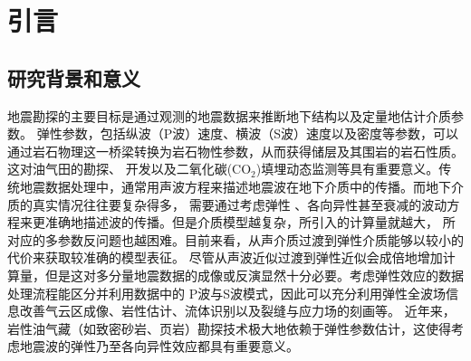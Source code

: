\chapter{引言}
\section{研究背景和意义}
地震勘探的主要目标是通过观测的地震数据来推断地下结构以及定量地估计介质参数。
弹性参数，包括纵波（P波）速度、横波（S波）速度以及密度等参数，可以通过岩石物理这一桥梁转换为岩石物性参数，从而获得储层及其围岩的岩石性质。这对油气田的勘探、
开发以及二氧化碳(CO$_2$)填埋动态监测等具有重要意义。传统地震数据处理中，通常用声波方程来描述地震波在地下介质中的传播。而地下介质的真实情况往往要复杂得多，
需要通过考虑弹性
、各向异性甚至衰减的波动方程来更准确地描述波的传播。但是介质模型越复杂，所引入的计算量就越大，
所对应的多参数反问题也越困难。目前来看，从声介质过渡到弹性介质能够以较小的代价来获取较准确的模型表征。
尽管从声波近似过渡到弹性近似会成倍地增加计算量，但是这对多分量地震数据的成像或反演显然十分必要。考虑弹性效应的数据处理流程能区分并利用数据中的
P波与S波模式，因此可以充分利用弹性全波场信息改善气云区成像、岩性估计、流体识别以及裂缝与应力场的刻画等。
近年来，岩性油气藏（如致密砂岩、页岩）勘探技术极大地依赖于弹性参数估计，这使得考虑地震波的弹性乃至各向异性效应都具有重要意义。

